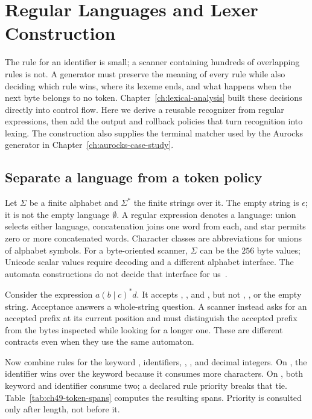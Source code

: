 \chapter{Regular Languages and Lexer Construction}
\label{ch:lexer-construction}

The rule for an identifier is small; a scanner containing hundreds of overlapping rules is not.
A generator must preserve the meaning of every rule while also deciding which rule wins, where its lexeme ends, and what happens when the next byte belongs to no token.
Chapter~\ref{ch:lexical-analysis} built these decisions directly into control flow.
Here we derive a reusable recognizer from regular expressions, then add the output and rollback policies that turn recognition into lexing.
The construction also supplies the terminal matcher used by the Aurocks generator in Chapter~\ref{ch:aurocks-case-study}.

\section{Separate a language from a token policy}
\label{sec:ch49-language-policy}

Let $\Sigma$ be a finite alphabet and $\Sigma^*$ the finite strings over it.
The empty string is $\epsilon$; it is not the empty language $\emptyset$.
A regular expression denotes a language: union selects either language, concatenation joins one word from each, and star permits zero or more concatenated words.
Character classes are abbreviations for unions of alphabet symbols.
For a byte-oriented scanner, $\Sigma$ can be the $256$ byte values; Unicode scalar values require decoding and a different alphabet interface.
The automata constructions do not decide that interface for us~\cite{hopcroft-2007-automata}.

Consider the expression $a(b\mid c)^*d$.
It accepts , , and , but not , , or the empty string.
Acceptance answers a whole-string question.
A scanner instead asks for an accepted prefix at its current position and must distinguish the accepted prefix from the bytes inspected while looking for a longer one.
These are different contracts even when they use the same automaton.

Now combine rules for the keyword , identifiers, \code{=}, \code{==}, and decimal integers.
On , the identifier wins over the keyword because it consumes more characters.
On , both keyword and identifier consume two; a declared rule priority breaks that tie.
Table~\ref{tab:ch49-token-spans} computes the resulting spans.
Priority is consulted only after length, not before it.

